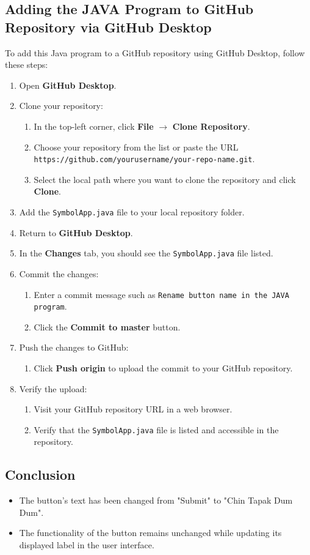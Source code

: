 \subsection{Adding the JAVA Program to GitHub Repository via GitHub Desktop}
To add this Java program to a GitHub repository using GitHub Desktop, follow these steps:
\begin{enumerate}
    \item Open \textbf{GitHub Desktop}.
    \item Clone your repository:
    \begin{enumerate}
        \item In the top-left corner, click \textbf{File} \(\rightarrow\) \textbf{Clone Repository}.
        \item Choose your repository from the list or paste the URL \texttt{https://github.com/yourusername/your-repo-name.git}.
        \item Select the local path where you want to clone the repository and click \textbf{Clone}.
    \end{enumerate}
    \item Add the \texttt{SymbolApp.java} file to your local repository folder.
    \item Return to \textbf{GitHub Desktop}.
    \item In the \textbf{Changes} tab, you should see the \texttt{SymbolApp.java} file listed.
    \item Commit the changes:
    \begin{enumerate}
        \item Enter a commit message such as \texttt{Rename button name in the JAVA program}.
        \item Click the \textbf{Commit to master} button.
    \end{enumerate}
    \item Push the changes to GitHub:
    \begin{enumerate}
        \item Click \textbf{Push origin} to upload the commit to your GitHub repository.
    \end{enumerate}
    \item Verify the upload:
    \begin{enumerate}
        \item Visit your GitHub repository URL in a web browser.
        \item Verify that the \texttt{SymbolApp.java} file is listed and accessible in the repository.
    \end{enumerate}
\end{enumerate}


\subsection{Conclusion}
\begin{itemize}
    \item The button's text has been changed from "Submit" to "Chin Tapak Dum Dum".
    \item The functionality of the button remains unchanged while updating its displayed label in the user interface.
\end{itemize}
